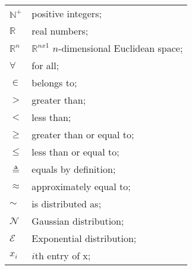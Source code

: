 \begin{longtable}{ll}
	$\mathbb{N}^+$			& positive integers; \\
	$\mathbb{R}$			& real numbers; \\
	$\mathbb{R}^n$			& $\mathbb{R}^{nx1}$ $n$-dimensional Euclidean space; \\
	
	$\forall$				& for all; \\
	$\in$					& belongs to; \\
	$>$						& greater than; \\
	$<$						& less than; \\
	$\geq$					& greater than or equal to; \\
	$\leq$					& less than or equal to; \\
	$\triangleq$			& equals by definition; \\	
	$\approx$				& approximately equal to; \\
	$\sim$					& is distributed as; \\
	
	$\mathcal{N}$			& Gaussian distribution; \\
	$\mathcal{E}$			& Exponential distribution; \\
	$x_i$					& $i$th entry of x; \\	
	

\end{longtable}
